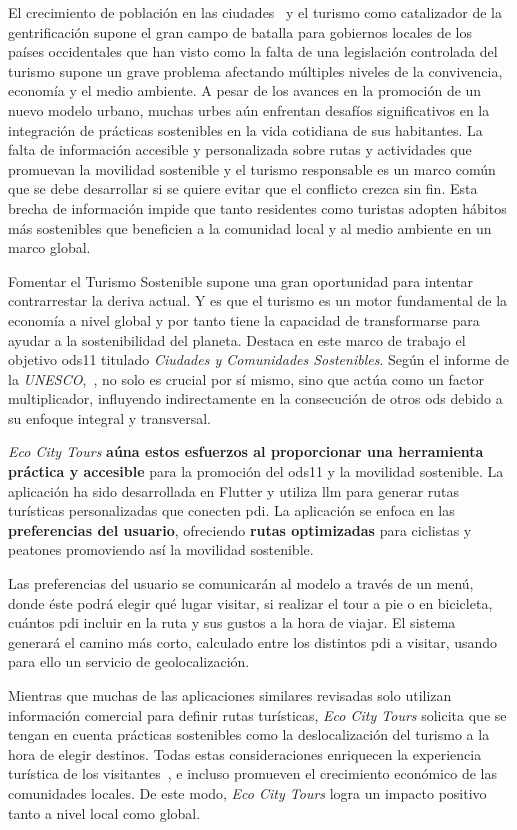 
El crecimiento de población en las ciudades~\cite{nieuwenhuijsen_urban_2020} y el turismo como catalizador de la gentrificación supone el gran campo de batalla para gobiernos locales de los países occidentales que han visto como la falta de una legislación controlada del turismo supone un grave problema afectando múltiples niveles de la convivencia, economía y el medio ambiente. A pesar de los avances en la promoción de un nuevo modelo urbano, muchas urbes aún enfrentan desafíos significativos en la integración de prácticas sostenibles en la vida cotidiana de sus habitantes. La falta de información accesible y personalizada sobre rutas y actividades que promuevan la movilidad sostenible y el turismo responsable es un marco común que se debe desarrollar si se quiere evitar que el conflicto crezca sin fin. Esta brecha de información impide que tanto residentes como turistas adopten hábitos más sostenibles que beneficien a la comunidad local y al medio ambiente en un marco global.

Fomentar el Turismo Sostenible supone una gran oportunidad para intentar contrarrestar la deriva actual. Y es que el turismo es un motor fundamental de la economía a nivel global y por tanto tiene la capacidad de transformarse para ayudar a la sostenibilidad del planeta.  Destaca en este marco de trabajo el  objetivo \acrfull{ods11} titulado \textit{Ciudades y Comunidades Sostenibles}. Según el informe de la \textit{UNESCO},~\cite{ionescu_progress_2024}, no solo es crucial por sí mismo, sino que actúa como un factor multiplicador, influyendo indirectamente en la consecución de otros \acrshort{ods} debido a su enfoque integral y transversal.

\textit{Eco City Tours} \textbf{aúna estos esfuerzos al proporcionar una herramienta práctica y accesible} para la promoción del \acrshort{ods11} y la movilidad sostenible. La aplicación ha sido desarrollada en Flutter y utiliza \acrfull{llm} para generar rutas turísticas personalizadas que conecten \acrfull{pdi}. La aplicación se enfoca en las \textbf{preferencias del usuario}, ofreciendo \textbf{rutas optimizadas} para ciclistas y peatones promoviendo así la movilidad sostenible.

Las preferencias del usuario se comunicarán al modelo a través de un menú, donde éste podrá elegir qué lugar visitar, si realizar el tour a pie o en bicicleta, cuántos \acrlong{pdi} incluir en la ruta y sus gustos a la hora de viajar. El sistema generará el camino más corto, calculado entre los distintos \acrshort{pdi} a visitar, usando para ello un servicio de geolocalización.

Mientras que muchas de las aplicaciones similares revisadas solo utilizan información comercial para definir rutas turísticas, \textit{Eco City Tours} solicita que se tengan en cuenta prácticas sostenibles como la deslocalización del turismo a la hora de elegir destinos. Todas estas consideraciones enriquecen la experiencia turística de los visitantes~\cite{mitas_tell_2023}, e incluso promueven el crecimiento económico de las comunidades locales. De este modo, \textit{Eco City Tours} logra un impacto positivo tanto a nivel local como global.